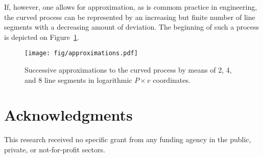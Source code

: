 \documentclass[fleqn,11pt]{SelfArx}
\begin{document}
    If, however, one allows for approximation, as is commom practice in engineering, the  curved
    process can be represented by an increasing but  finite  number  of  line  segments  with  a
    decreasing amount of deviation. The beginning of such a process is depicted on
    Figure~\ref{fig:approx}.

    \begin{figure}[ht]
        \centering
        \texttt{[image: fig/approximations.pdf]}
        \caption{Successive approximations to the curved process by means of 2, 4,  and  8  line
            segments in logarithmic $P\times v$ coordinates.}
        \label{fig:approx}
    \end{figure}

\section*{Acknowledgments}

    This research received no specific grant from any funding agency in the public, private,  or
    not-for-profit sectors.





\end{document}
